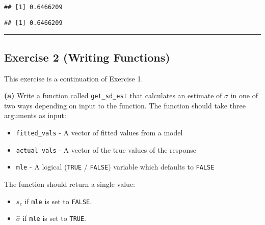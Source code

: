 \documentclass[]{article}
\newenvironment{Shaded}{\begin{snugshade}}{\end{snugshade}}
\newcommand{\KeywordTok}[1]{\textcolor[rgb]{0.13,0.29,0.53}{\textbf{#1}}}
\newcommand{\CommentTok}[1]{\textcolor[rgb]{0.56,0.35,0.01}{\textit{#1}}}
\newcommand{\OperatorTok}[1]{\textcolor[rgb]{0.81,0.36,0.00}{\textbf{#1}}}
\newcommand{\NormalTok}[1]{#1}
\providecommand{\tightlist}{%
  \setlength{\itemsep}{0pt}\setlength{\parskip}{0pt}}
\begin{document}
\begin{verbatim}
## [1] 0.6466209
\end{verbatim}

\begin{Shaded}
\end{Shaded}

\begin{verbatim}
## [1] 0.6466209
\end{verbatim}

\begin{center}\rule{0.5\linewidth}{\linethickness}\end{center}

\subsection{Exercise 2 (Writing
Functions)}\label{exercise-2-writing-functions}

This exercise is a continuation of Exercise 1.

\textbf{(a)} Write a function called \texttt{get\_sd\_est} that
calculates an estimate of \(\sigma\) in one of two ways depending on
input to the function. The function should take three arguments as
input:

\begin{itemize}
\tightlist
\item
  \texttt{fitted\_vals} - A vector of fitted values from a model
\item
  \texttt{actual\_vals} - A vector of the true values of the response
\item
  \texttt{mle} - A logical (\texttt{TRUE} / \texttt{FALSE}) variable
  which defaults to \texttt{FALSE}
\end{itemize}

The function should return a single value:

\begin{itemize}
\tightlist
\item
  \(s_e\) if \texttt{mle} is set to \texttt{FALSE}.
\item
  \(\hat{\sigma}\) if \texttt{mle} is set to \texttt{TRUE}.
\end{itemize}
\end{document}
